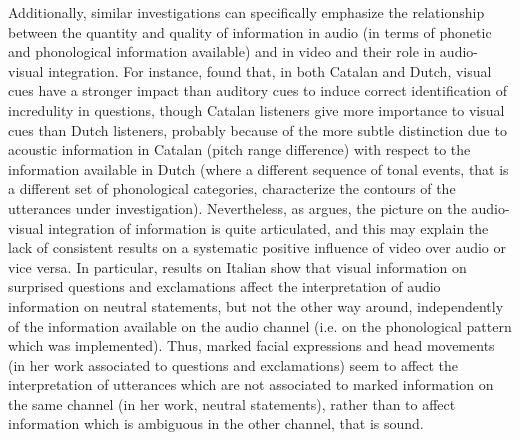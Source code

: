 \documentclass[output=paper]{langsci/langscibook}
\begin{document}
Additionally, similar investigations can specifically emphasize the relationship between the quantity and quality of information in audio (in terms of phonetic and phonological information available) and in video and their role in audio-visual integration. For instance,  \citet{CrespoSendra2013} found that, in both Catalan and Dutch, visual cues have a stronger impact than auditory cues to induce correct identification of incredulity in questions, though Catalan listeners give more importance to visual cues than Dutch listeners, probably because of the more subtle distinction due to acoustic information in Catalan (pitch range difference) with respect to the information available in Dutch (where a different sequence of tonal events, that is a different set of phonological categories, characterize the contours of the utterances under investigation). Nevertheless, as \citet{GiliFivela2015informazionimultimodali} argues, the picture on the audio-visual integration of information is quite articulated, and this may explain the lack of consistent results on a systematic positive influence of video over audio or vice versa. In particular, results on Italian show that visual information on surprised questions and exclamations affect the interpretation of audio information on neutral statements, but not the other way around, independently of the information available on the audio channel (i.e. on the phonological pattern which was implemented). Thus, marked facial expressions and head movements (in her work associated to questions and exclamations) seem to affect the interpretation of utterances which are not associated to marked information on the same channel (in her work, neutral statements), rather than to affect information which is ambiguous in the other channel, that is sound.\largerpage[-1] 
\end{document}
